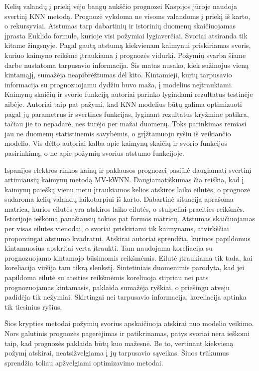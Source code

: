 \documentclass[]{VUMIFTemplateClass}
\begin{document}
    Kelių valandų į priekį vėjo bangų aukščio prognozei Kaspijos jūroje \cite{zamani2008} naudoja svertinį KNN metodą.
    Prognozė vykdoma ne visoms valandoms į priekį iš karto, o rekursyviai.
    Atstumas tarp dabartinių ir istorinių duomenų skaičiuojamas įprasta Euklido formule, kurioje visi požymiai lygiaverčiai.
    Svoriai atsiranda tik kitame žingsnyje.
    Pagal gautą atstumą kiekvienam kaimynui priskiriamas svoris, kuriuo kaimyno reikšmė įtraukiama į prognozės vidurkį.
    Požymių svarba šiame darbe nustatoma tarpusavio informacija.
    Šis matas nusako, kiek sužinojus vieną kintamąjį, sumažėja neapibrėžtumas dėl kito.
    Kintamieji, kurių tarpusavio informacija su prognozuojamu dydžiu buvo maža, į modelius neįtraukiami.
    Kaimynų skaičių ir svorio funkciją autoriai parinko lygindami rezultatus testinėje aibėje.
    Autoriai taip pat pažymi, kad KNN modelius būtų galima optimizuoti pagal jų parametrus ir svertines funkcijas, lyginant rezultatus kryžmine patikra, tačiau jie to nepadarė, nes turėjo per mažai duomenų.
    Toks parinkimas remiasi jau ne duomenų statistinėmis savybėmis, o grįžtamuoju ryšiu iš veikiančio modelio.
    Vis dėlto autoriai kalba apie kaimynų skaičių ir svorio funkcijos pasirinkimą, o ne apie požymių svorius atstumo funkcijoje.

    Ispanijos elektros rinkos kainų ir paklausos prognozei \cite{talaverallames2019} pasiūlė daugiamatį svertinį artimiausių kaimynų metodą MV-kWNN.
    Daugiamatiškumas čia reiškia, kad į kaimynų paiešką vienu metu įtraukiamos kelios atskiros laiko eilutės, o prognozė sudaroma kelių valandų laikotarpiui iš karto.
    Dabartinė situacija aprašoma matrica, kurios eilutės yra atskiros laiko eilutės, o stulpeliai praeities reikšmės.
    Istorijoje ieškoma panašiausių tokios pat formos matricų.
    Atstumas skaičiuojamas per visas eilutes vienodai, o svoriai priskiriami tik kaimynams, atvirkščiai proporcingai atstumo kvadratui.
    Atskirai autoriai sprendžia, kuriuos papildomus kintamuosius apskritai verta įtraukti.
    Tam naudojama koreliacija su prognozuojamo kintamojo būsimomis reikšmėmis.
    Eilutė įtraukiama tik tada, kai koreliacija viršija tam tikrą slenkstį.
    Sintetiniais duomenimis parodyta, kad jei papildoma eilutė su ateities reikšmėmis koreliuoja stipriau nei pats prognozuojamas kintamasis, paklaida sumažėja ryškiai, o priešingu atveju padidėja tik nežymiai.
    Skirtingai nei tarpusavio informacija, koreliacija aptinka tik tiesinius ryšius.

    Šios krypties metodai požymių svorius apskaičiuoja atskirai nuo modelio veikimo.
    Nors galutinis prognozės pagerėjimas ir patikrinamas, patys svoriai nėra ieškomi taip, kad prognozės paklaida būtų kuo mažesnė.
    Be to, vertinant kiekvieną požymį atskirai, neatsižvelgiama į jų tarpusavio sąveikas.
    Šiuos trūkumus sprendžia toliau apžvelgiami optimizavimo metodai.
\end{document}
